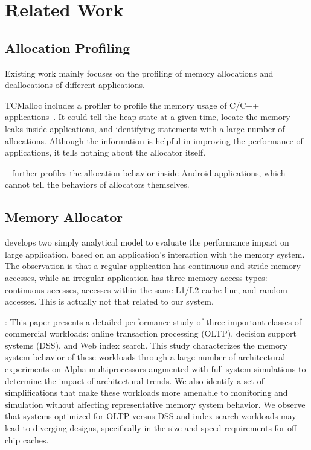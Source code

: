 \section{Related Work}


\subsection{Allocation Profiling}
Existing work mainly focuses on the profiling of memory allocations and deallocations of different applications. 

TCMalloc includes a profiler to profile the memory usage of C/C++ applications~\cite{ghemawat2007tcmalloc}. It could tell the heap state at a given time, locate the memory leaks inside applications, and identifying statements with a large number of allocations. Although the information is helpful in improving the performance of applications, it tells nothing about the allocator itself. 

~\cite{7031343} further profiles the allocation behavior inside Android applications, which cannot tell the behaviors of allocators themselves. 

\subsection{Memory Allocator}

\cite{1291361} develops two simply analytical model to evaluate the performance impact on large application, based on an application's interaction with the memory system. The observation is that a regular application has continuous and stride memory accesses, while an irregular application has three memory access types: continuous accesses, accesses within the same L1/L2 cache line, and random accesses. This is actually not that related to our system. 


\cite{Barroso:1998:MSC:279358.279363}: This paper presents a detailed performance study of three important classes of commercial workloads: online transaction processing (OLTP), decision support systems (DSS), and Web index search.  This study characterizes the memory system behavior of these workloads through a large number of architectural experiments on Alpha multiprocessors augmented with full system simulations to determine the impact of architectural trends. We also identify a set of simplifications that make these workloads more amenable to monitoring and simulation without affecting representative memory system behavior. We observe that systems optimized for OLTP versus DSS and index search workloads may lead to diverging designs, specifically in the size and speed requirements for off-chip caches.

